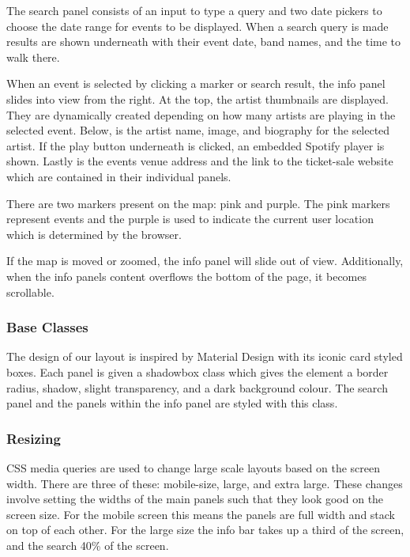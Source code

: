 \documentclass[10pt]{article}
\begin{document}
                The search panel consists of an input to type a query and two date pickers to choose the date range for events to be displayed. When a search query is made results are shown underneath with their event date, band names, and the time to walk there.

                When an event is selected by clicking a marker or search result, the info panel slides into view from the right. At the top, the artist thumbnails are displayed. They are dynamically created depending on how many artists are playing in the selected event. Below, is the artist name, image, and biography for the selected artist. If the play button underneath is clicked, an embedded Spotify player is shown. Lastly is the events venue address and the link to the ticket-sale website which are contained in their individual panels.

                There are two markers present on the map: pink and purple. The pink markers represent events and the purple is used to indicate the current user location which is determined by the browser.

               If the map is moved or zoomed, the info panel will slide out of view. Additionally, when the info panel\textquotesingle s content overflows the bottom of the page, it becomes scrollable.


            \subsubsection{Base Classes}
                The design of our layout is inspired by Material Design with it\textquotesingle s iconic card styled boxes. Each panel is given a shadowbox class which gives the element a border radius, shadow, slight transparency, and a dark background colour. The search panel and the panels within the info panel are styled with this class.

            \subsubsection{Resizing}
                CSS media queries are used to change large scale layouts based on the screen width. There are three of these: mobile-size, large, and extra large. These changes involve setting the widths of the main panels such that they look good on the screen size. For the mobile screen this means the panels are full width and stack on top of each other. For the large size the info bar takes up a third of the screen, and the search 40\% of the screen.
\end{document}
